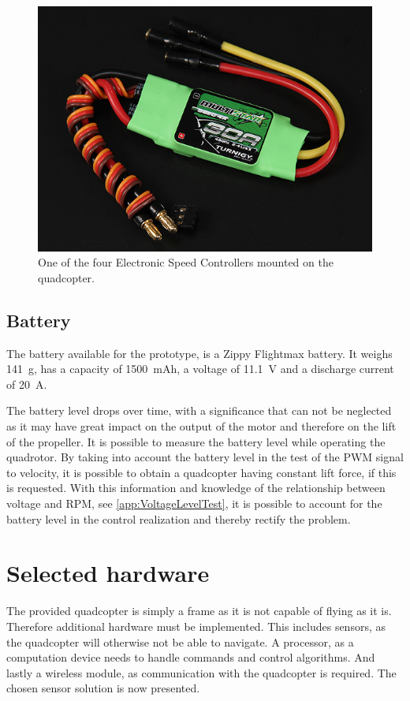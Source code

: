 \begin{figure}[H]
	\centering
	\includegraphics[scale=0.4]{figures/ESC}
	\caption{One of the four Electronic Speed Controllers mounted on the quadcopter.\cite{HKing}}
	\label{fig:esc}
\end{figure}

\subsection{Battery}
The battery available for the prototype, is a Zippy Flightmax battery. It weighs \SI{141}{g}, has a capacity of \SI{1500}{mAh}, a voltage of \SI{11.1}{V} and a discharge current of \SI{20}{A}.

The battery level drops over time, with a significance that can not be neglected as it may have great impact on the output of the motor and therefore on the lift of the propeller. It is possible to measure the battery level while operating the quadrotor. By taking into account the battery level in the test of the PWM signal to velocity, it is possible to obtain a quadcopter having constant lift force, if this is requested. With this information and knowledge of the relationship between voltage and RPM, see \autoref{app:VoltageLevelTest}, it is possible to account for the battery level in the control realization and thereby rectify the problem.

\section{Selected hardware}
The provided quadcopter is simply a frame as it is not capable of flying as it is. Therefore additional hardware must be implemented. This includes sensors, as the quadcopter will otherwise not be able to navigate. A processor, as a computation device needs to handle commands and control algorithms. And lastly a wireless module, as communication with the quadcopter is required. The chosen sensor solution is now presented.


